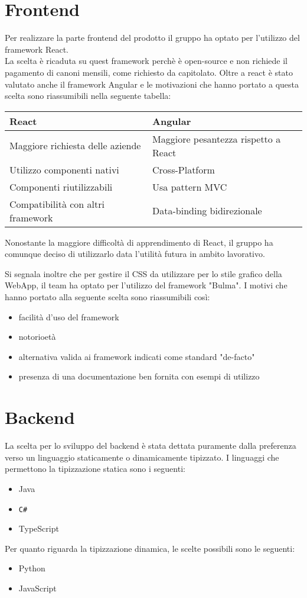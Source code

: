 \documentclass[12pt]{article}
\begin{document}
\section{Frontend}
Per realizzare la parte frontend del prodotto il gruppo ha optato per l'utilizzo del framework React. \\
La scelta è ricaduta su quest framework perchè è open-source e non richiede il pagamento di canoni mensili, come richiesto da capitolato.
Oltre a react è stato valutato anche il framework Angular e le motivazioni che hanno portato a questa scelta sono riassumibili nella seguente tabella: \\
\begin{center}
\begin{tabular}{ |p{8cm}|p{8cm}| }
	\hline
	 \textbf{React} & \textbf{Angular}\\ 
	 \hline
	 Maggiore richiesta delle aziende & Maggiore pesantezza rispetto a React \\  
	 \hline
	 Utilizzo componenti nativi & Cross-Platform \\ 
	 \hline
	 Componenti riutilizzabili & Usa pattern MVC \\
	 \hline
	 Compatibilità con altri framework & Data-binding bidirezionale \\
	\hline
\end{tabular}
\end{center}
Nonostante la maggiore difficoltà di apprendimento di React, il gruppo ha comunque deciso di utilizzarlo data l'utilità futura in ambito lavorativo.

Si segnala inoltre che per gestire il CSS da utilizzare per lo stile grafico della WebApp, il team ha optato per l'utilizzo del framework "Bulma". I motivi che hanno portato alla seguente scelta sono riassumibili così:
\begin{itemize}
    \item  facilità d'uso del framework
    \item  notorioetà
    \item  alternativa valida ai framework indicati come standard "de-facto"
    \item  presenza di una documentazione ben fornita con esempi di utilizzo
\end{itemize} 
\section{Backend}
La scelta per lo sviluppo del backend è stata dettata puramente dalla preferenza verso un linguaggio staticamente o dinamicamente tipizzato.
I linguaggi che permettono la tipizzazione statica sono i seguenti:
\begin{itemize}
	\item Java
	\item \texttt{C\#}
	\item TypeScript
\end{itemize}
Per quanto riguarda la tipizzazione dinamica, le scelte possibili sono le seguenti:
\begin{itemize}
	\item Python
	\item JavaScript
\end{itemize}
\end{document}
